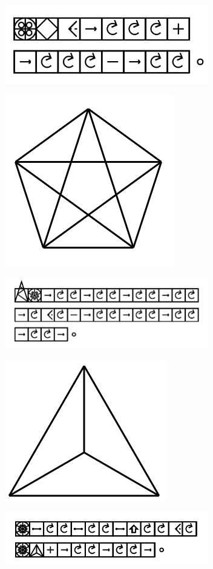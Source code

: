\documentclass[11pt]{article}
\begin{document}
\includegraphics[width=3.5in]{image15.png}

\includegraphics{image16.png}

\includegraphics[width=3.5in]{image17.png}

\includegraphics{image18.png}

\includegraphics[width=3.5in]{image19.png}
\end{document}
